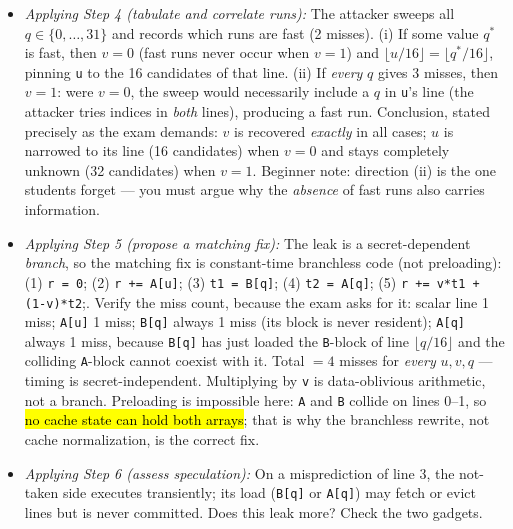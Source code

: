 \documentclass[12pt, a4paper]{article}
\newcommand{\term}[1]{\textbf{\textit{#1}}}        %
\newcommand{\imp}[1]{\hl{#1}}                       %
\begin{document}
\begin{itemize}
\begin{tightitem}
    \end{tightitem}
    The key skill is the hit test: a hit requires the \emph{same block} (not just the same line number) to be resident.
    \item \textit{Applying Step 4 (tabulate and correlate runs):} The attacker sweeps all $q \in \{0, \dots, 31\}$ and records which runs are fast (2 misses). (i) If some value $q^{\ast}$ is fast, then $v = 0$ (fast runs never occur when $v = 1$) and $\lfloor u/16 \rfloor = \lfloor q^{\ast}/16 \rfloor$, pinning \texttt{u} to the 16 candidates of that line. (ii) If \emph{every} $q$ gives 3 misses, then $v = 1$: were $v = 0$, the sweep would necessarily include a $q$ in \texttt{u}'s line (the attacker tries indices in \emph{both} lines), producing a fast run.
    Conclusion, stated precisely as the exam demands: $v$ is recovered \emph{exactly} in all cases; $u$ is narrowed to its line (16 candidates) when $v = 0$ and stays completely unknown (32 candidates) when $v = 1$.
    Beginner note: direction (ii) is the one students forget --- you must argue why the \emph{absence} of fast runs also carries information.
    \item \textit{Applying Step 5 (propose a matching fix):} The leak is a secret-dependent \emph{branch}, so the matching fix is constant-time branchless code (not preloading): (1) \texttt{r = 0}; (2) \texttt{r += A[u]}; (3) \texttt{t1 = B[q]}; (4) \texttt{t2 = A[q]};
    (5) \texttt{r += v*t1 + (1-v)*t2};. Verify the miss count, because the exam asks for it: scalar line 1 miss; \texttt{A[u]} 1 miss; \texttt{B[q]} always 1 miss (its block is never resident); \texttt{A[q]} always 1 miss, because \texttt{B[q]} has just loaded the \texttt{B}-block of line $\lfloor q/16 \rfloor$ and the colliding \texttt{A}-block cannot coexist with it.
    Total $= 4$ misses for \emph{every} $u, v, q$ --- timing is secret-independent. Multiplying by \texttt{v} is data-oblivious arithmetic, not a branch.
    Preloading is impossible here: \texttt{A} and \texttt{B} collide on lines 0--1, so \imp{no cache state can hold both arrays}; that is why the branchless rewrite, not cache normalization, is the correct fix.
    \item \textit{Applying Step 6 (assess speculation):} On a misprediction of line 3, the not-taken side executes transiently; its load (\texttt{B[q]} or \texttt{A[q]}) may fetch or evict lines but is never committed. Does this leak more? Check the two gadgets.
\end{itemize}
\end{document}
